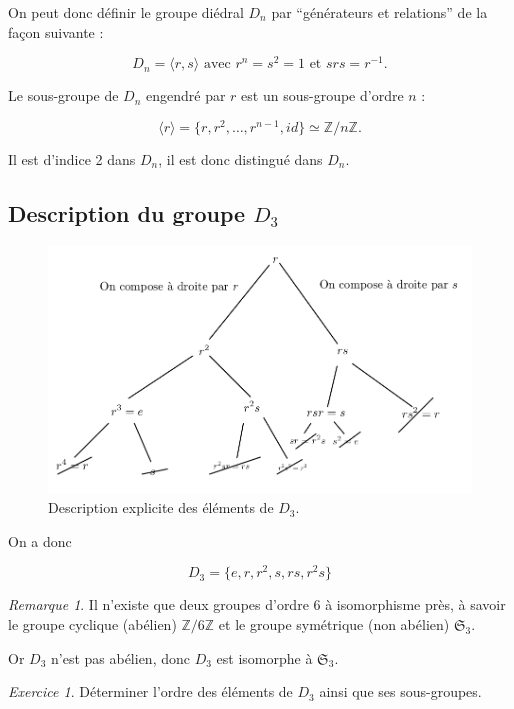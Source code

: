 \documentclass[french]{book}
\theoremstyle{definition}
\theoremstyle{remark}
\newtheorem*{remark}{Remarque}
\newtheorem{exo}{Exercice}
\begin{document}
On peut donc définir le groupe diédral $D_n$ par ``générateurs et relations'' de la façon suivante :

\[
D_n = \langle r,s \rangle  \text{ avec } r ^{n} = s ^2 = 1 \text{ et } s r s = r ^{-1} .
\]

Le sous-groupe de $D_n$ engendré par $r$ est un sous-groupe d'ordre $n$ :

\[
\langle r \rangle = \{ r, r ^2, \dots, r ^{n-1}, id \} \simeq \mathbb{Z}/{ n }\mathbb{Z} .
\]

Il est d'indice 2 dans $D_n$, il est donc distingué dans $D_n$.

\subsection{Description du groupe $D_3$}

\begin{figure}[h!]
  \centering
  \includegraphics[scale=0.3]{figures/elts-d3.png}
  \caption{Description explicite des éléments de $D_3$.}
  \label{}
\end{figure}

On a donc

\[
D_3 = \{ e, r, r ^2, s, rs, r ^2 s \}
\]

\begin{remark}
  Il n'existe que deux groupes d'ordre 6 à isomorphisme près, à savoir le groupe cyclique (abélien) $\mathbb{Z}/{ 6 }\mathbb{Z}$ et le groupe symétrique (non abélien) $\mathfrak{S}_{3} $.
\end{remark}

Or $D_3$ n'est pas abélien, donc $D_3$ est isomorphe à $\mathfrak{S}_{3} $.

\begin{exo}
  Déterminer l'ordre des éléments de $D_3$ ainsi que ses sous-groupes.
\end{exo}
\end{document}
